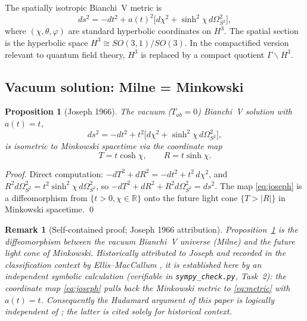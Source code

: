 \documentclass[12pt,letterpaper]{article}
\newtheorem{proposition}[theorem]{Proposition}
\newtheorem{remark}[theorem]{Remark}
\newcommand{\Rbb}{\mathbb{R}}
\begin{document}
The spatially isotropic Bianchi~V metric is
\begin{equation}
  ds^2 = -dt^2 + a(t)^2\bigl[d\chi^2 + \sinh^2\!\chi\,d\Omega^2_{S^2}\bigr],
  \label{eq:metric}
\end{equation}
where $(\chi,\theta,\varphi)$ are standard hyperbolic coordinates on $H^3$.
The spatial section is the hyperbolic space $H^3 \cong SO(3,1)/SO(3)$.
In the compactified version relevant to quantum field theory,
$H^3$ is replaced by a compact quotient $\Gamma\backslash H^3$.

\subsection{Vacuum solution: Milne = Minkowski}

\begin{proposition}[Joseph 1966]
\label{prop:vacuum}
The vacuum ($T_{ab}=0$) Bianchi~V solution with $a(t) = t$,
\[
  ds^2 = -dt^2 + t^2\bigl[d\chi^2 + \sinh^2\!\chi\,d\Omega^2_{S^2}\bigr],
\]
is isometric to Minkowski spacetime via the coordinate map
\begin{equation}
  T = t\cosh\chi, \qquad R = t\sinh\chi.
  \label{eq:joseph}
\end{equation}
\end{proposition}
\begin{proof}
Direct computation: $-dT^2 + dR^2 = -dt^2 + t^2\,d\chi^2$,
and $R^2 d\Omega^2_{S^2} = t^2\sinh^2\!\chi\,d\Omega^2_{S^2}$, so
$-dT^2 + dR^2 + R^2d\Omega^2_{S^2} = ds^2$.
The map \eqref{eq:joseph} is a diffeomorphism from
$\{t>0, \chi\in\Rbb\}$ onto the future light cone $\{T>|R|\}$
in Minkowski spacetime.
\qed
\end{proof}

\begin{remark}[Self-contained proof; Joseph 1966 attribution]
Proposition~\ref{prop:vacuum} is the diffeomorphism between the
vacuum Bianchi~V universe (Milne) and the future light cone of
Minkowski.  Historically attributed to Joseph
\cite{Joseph66} and recorded in the classification context by
Ellis--MacCallum \cite{Ellis-MacCallum69}, it is established here by
an independent symbolic calculation (verifiable in
\texttt{sympy\_check.py}, Task~2): the coordinate map
\eqref{eq:joseph} pulls back the Minkowski metric to
\eqref{eq:metric} with $a(t)=t$.  Consequently the Hadamard argument
of this paper is logically independent of \cite{Joseph66}; the latter
is cited solely for historical context.
\end{remark}
\end{document}
